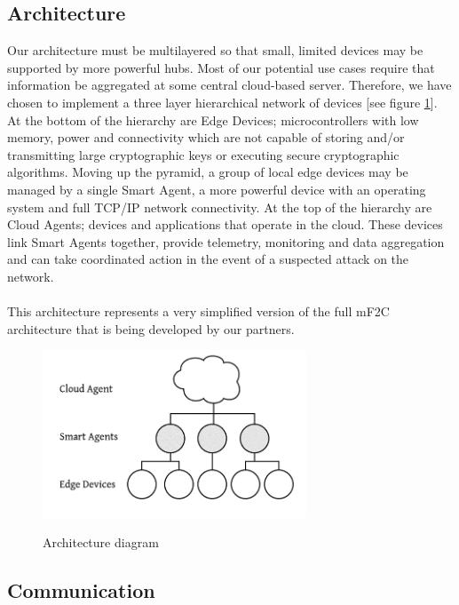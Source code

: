 \subsection{Architecture}

Our architecture must be multilayered so that small, limited devices may be supported by more powerful hubs. Most of our potential use cases require that information be aggregated at some central cloud-based server. Therefore, we have chosen to implement a three layer hierarchical network of devices [see figure \ref{fig:simplified_architecture}]. At the bottom of the hierarchy are Edge Devices; microcontrollers with low memory, power and connectivity which are not capable of storing and/or transmitting large cryptographic keys or executing secure cryptographic algorithms. Moving up the pyramid, a group of local edge devices may be managed by a single Smart Agent, a more powerful device with an operating system and full TCP/IP network connectivity. At the top of the hierarchy are Cloud Agents; devices and applications that operate in the cloud. These devices link Smart Agents together, provide telemetry, monitoring and data aggregation and can take coordinated action in the event of a suspected attack on the network.

\paragraph{}
This architecture represents a very simplified version of the full mF2C architecture that is being developed by our partners.


\begin{figure}[h]
  \centering
    \includegraphics[width=0.7\textwidth]{simplified_architecture}
    \label{fig:simplified_architecture}
    \caption{Architecture diagram}
\end{figure}


\subsection{Communication}

